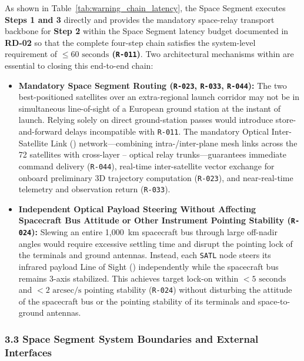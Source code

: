 As shown in Table~\ref{tab:warning_chain_latency}, the Space Segment executes \textbf{Steps 1 and 3} directly and provides the mandatory space-relay transport backbone for \textbf{Step 2} within the Space Segment latency budget documented in \textbf{RD-02} so that the complete four-step chain satisfies the system-level requirement of \textbf{$\le 60\text{ seconds}$ (\texttt{R-011})}. Two architectural mechanisms within  are essential to closing this end-to-end chain:
\begin{itemize}
    \item \textbf{Mandatory Space Segment  Routing (\texttt{R-023}, \texttt{R-033}, \texttt{R-044}):} The two best-positioned  satellites over an extra-regional launch corridor may not be in simultaneous line-of-sight of a European ground station at the instant of launch. Relying solely on direct ground-station passes would introduce store-and-forward delays incompatible with \texttt{R-011}. The mandatory  Optical Inter-Satellite Link () network---combining intra-/inter-plane  mesh links across the 72  satellites with cross-layer -- optical relay trunks---guarantees immediate command delivery (\texttt{R-044}), real-time inter-satellite  vector exchange for onboard preliminary 3D trajectory computation (\texttt{R-023}), and near-real-time telemetry and observation return (\texttt{R-033}).
    \item \textbf{Independent Optical Payload  Steering Without Affecting Spacecraft Bus Attitude or Other Instrument Pointing Stability (\texttt{R-024}):} Slewing an entire 1,000~km  spacecraft bus through large off-nadir angles would require excessive settling time and disrupt the pointing lock of the  terminals and ground antennas. Instead, each \texttt{SATL} node steers its infrared payload Line of Sight () independently while the spacecraft bus remains 3-axis stabilized. This achieves target lock-on within $< 5\text{ seconds}$ and $< 2\text{ arcsec/s}$  pointing stability (\texttt{R-024}) without disturbing the attitude of the spacecraft bus or the pointing stability of its  terminals and space-to-ground antennas.
\end{itemize}

\subsubsection{3.3 Space Segment System Boundaries and External Interfaces}

